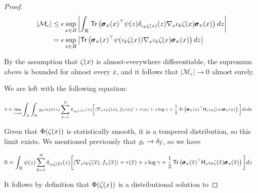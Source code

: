 \begin{proof}
  \begin{align*}
    |\mathcal{M}_\epsilon|
    &\leq \epsilon\sup_{x\in
      B}\left|\int_{\returnspace}\trace\left(\quadraticform{\xxs(x)}{\psi(z)\dirac{\proj{k}\statistics(x)}(z)\nabla_x\proj{k}\statistics(x)}\right)dz\right|\\
    &= \epsilon\sup_{x\in
      B}\left|\trace\left(\quadraticform{\xxs(x)}{\psi(\proj{k}\statistics(x))\nabla_x\proj{k}\statistics(x)}\right)dz\right|\\
  \end{align*}
    
  By the assumption that $\zeta_{}(x)$ is almost-everywhere
  differentiable, the supremum above is bounded for almost every
  $\overline{x}$, and it follows that $|\mathcal{M}_\epsilon|\to 0$
  almost surely.
    
  We are left with the following equation:
    
  \begin{equation*}
    \scriptsize
    \begin{aligned}
      0
      &= \lim_{\epsilon\to
        0}\int_{\xxX}\int_{\returnspace}\varrho_\epsilon(x)\psi(
        z)\sum_{k=1}^N\dirac{\proj{k}\statistics(x)}(z)\bigg[\langle\nabla_x\proj{k}\statistics(x),
        \xxf(x)\rangle + r(x) + z\log\gamma
        +\frac{1}{2}\trace\left(\quadraticform{\xxs(x)}{\hessian{x}\proj{k}\statistics(x)}\right)\bigg]dzdx
    \end{aligned}
  \end{equation*}
    
  Given that $\Phi(\zeta_{}(x))$ is statistically smooth, it is a
  tempered distribution, so this limit exists. We mentioned previously
  that $\varrho_\epsilon\to\delta_{\overline{x}}$, so we have

  \begin{equation*}
    \begin{aligned}
      0
      &=
        \int_{\returnspace}\psi(z)\sum_{k=1}^N\dirac{\proj{k}\statistics(\overline{x})}(z)\bigg[\langle\nabla_x\proj{k}\statistics(\overline{x}),
        \xxf(\overline{x})\rangle + r(\overline{x}) + z\log\gamma
        +\frac{1}{2}\trace\left(\quadraticform{\xxs(\overline{x})}{\hessian{x}\proj{k}\statistics(\overline{x})}\right)\bigg]dz
    \end{aligned}
  \end{equation*}
    
  It follows by definition that $\Phi(\zeta_{}(x))$ is a distributional solution to
    

\end{proof}
